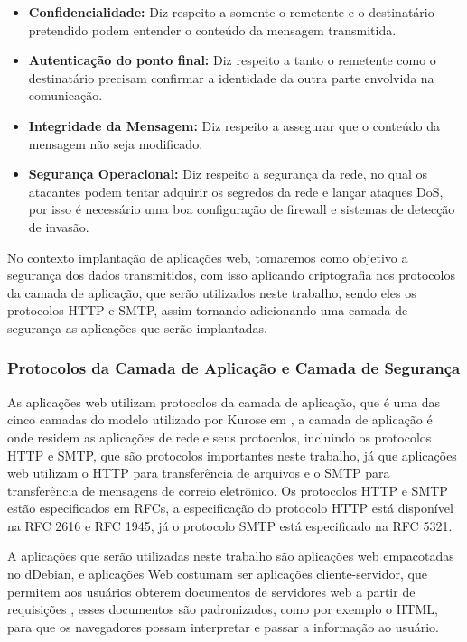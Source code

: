 \begin{itemize}
  \item \textbf{Confidencialidade:} Diz respeito a somente o remetente e o destinatário
  pretendido podem entender o conteúdo da mensagem transmitida.
  \item \textbf{Autenticação do ponto final:} Diz respeito a tanto o remetente como o destinatário
  precisam confirmar a identidade da outra parte envolvida na comunicação.
  \item \textbf{Integridade da Mensagem:} Diz respeito a assegurar que o conteúdo
  da mensagem não seja modificado.
  \item \textbf{Segurança Operacional:} Diz respeito a segurança da rede, no qual
  os atacantes podem tentar adquirir os segredos da rede e lançar ataques DoS,
  por isso é necessário uma boa configuração de firewall e sistemas de detecção
  de invasão.
\end{itemize}

No contexto implantação de aplicações web, tomaremos como objetivo a segurança
dos dados transmitidos, com isso aplicando criptografia nos protocolos da camada
de aplicação, que serão utilizados neste trabalho, sendo eles os protocolos HTTP
e SMTP, assim tornando adicionando uma camada de segurança as aplicações que
serão implantadas.

\subsubsection{Protocolos da Camada de Aplicação e Camada de Segurança}

As aplicações web utilizam protocolos da camada de aplicação, que é uma das
cinco camadas do modelo utilizado por Kurose em \cite{kurose2010redes}, a camada
de aplicação é onde residem as aplicações de rede e seus protocolos, incluindo
os protocolos HTTP e SMTP, que são protocolos importantes neste trabalho, já que
aplicações web utilizam o HTTP para transferência de arquivos e o SMTP para
transferência de mensagens de correio eletrônico. Os protocolos HTTP e SMTP estão especificados em RFCs, a especificação do protocolo
HTTP está disponível na RFC 2616 e RFC 1945, já o protocolo SMTP está especificado na RFC 5321.

A aplicações que serão utilizadas neste trabalho são aplicações web empacotadas no
dDebian, e aplicações Web costumam ser aplicações cliente-servidor, que permitem aos
usuários obterem documentos de servidores web a partir de requisições \cite{kurose2010redes},
esses documentos são padronizados, como por exemplo o HTML, para que os navegadores
possam interpretar e passar a informação ao usuário.

